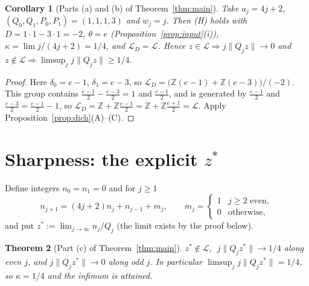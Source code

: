 \documentclass[11pt]{amsart}
\newtheorem{theorem}{Theorem}
\newtheorem{corollary}[theorem]{Corollary}
\theoremstyle{remark}
\newcommand{\Z}{\mathbb{Z}}
\newcommand{\dist}[1]{\lVert #1\rVert}
\newcommand{\LL}{\mathcal{L}}
\begin{document}
\begin{corollary}[Parts (a) and (b) of Theorem~\ref{thm:main}]\label{cor:lower}
Take $a_j=4j+2$, $(Q_0,Q_1,P_0,P_1)=(1,1,1,3)$ and $w_j=j$. Then (H) holds with $D=1\cdot1-3\cdot1=-2$,
$\theta=e$ (Proposition~\ref{prop:input}(i)), $\kappa=\lim j/(4j+2)=1/4$, and $\LL_D=\LL$.
Hence $z\in\LL\Rightarrow j\dist{Q_jz}\to0$ and $z\notin\LL\Rightarrow\limsup_jj\dist{Q_jz}\ge1/4$.
\end{corollary}

\begin{proof}
Here $\delta_0=e-1$, $\delta_1=e-3$, so $\LL_D=\bigl(\Z(e-1)+\Z(e-3)\bigr)/(-2)$. This group contains
$\frac{e-1}2-\frac{e-3}2=1$ and $\frac{e-1}2$, and is generated by $\frac{e-1}2$ and $\frac{e-3}2=\frac{e-1}2-1$,
so $\LL_D=\Z+\Z\frac{e-1}{2}=\Z+\Z\frac{e+1}{2}=\LL$. Apply Proposition~\ref{prop:dich}(A)--(C). \qedhere
\end{proof}

\section{Sharpness: the explicit $z^*$}\label{sec:sharp}

Define integers $n_0=n_1=0$ and for $j\ge1$
\[
n_{j+1}=(4j+2)n_j+n_{j-1}+m_j,\qquad m_j=\begin{cases}1&j\ge2\text{ even},\\0&\text{otherwise,}\end{cases}
\]
and put $z^*:=\lim_{j\to\infty}n_j/Q_j$ (the limit exists by the proof below).

\begin{theorem}[Part (c) of Theorem~\ref{thm:main}]\label{thm:sharp}
$z^*\notin\LL$, $\;j\dist{Q_jz^*}\to1/4$ along even $j$, and $j\dist{Q_jz^*}\to0$ along odd $j$.
In particular $\limsup_jj\dist{Q_jz^*}=1/4$, so $\kappa=1/4$ and the infimum is attained.
\end{theorem}
\end{document}
